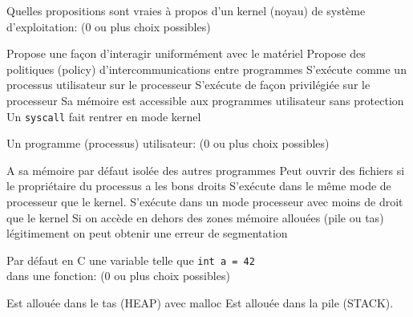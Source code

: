 \documentclass[11pt,a4paper,addpoint,answers]{exam}
\begin{document}
\begin{questions}
    \question[4] Quelles propositions sont vraies à propos d'un kernel (noyau) de système d'exploitation: (0 ou plus choix possibles)
    \begin{checkboxes}
        \CorrectChoice Propose une façon d'interagir uniformément avec le matériel
        \CorrectChoice Propose des politiques (policy) d'intercommunications entre programmes
        \choice S'exécute comme un processus utilisateur sur le processeur
        \CorrectChoice S'exécute de façon privilégiée sur le processeur
        \choice Sa mémoire est accessible aux programmes utilisateur sans protection
        \CorrectChoice Un \texttt{syscall} fait rentrer en mode kernel
    \end{checkboxes}

    \question[3] Un programme (processus) utilisateur: (0 ou plus choix possibles)
    \begin{checkboxes}
        \CorrectChoice A sa mémoire par défaut isolée des autres programmes
        \CorrectChoice Peut ouvrir des fichiers si le propriétaire du processus a les bons droits
        \choice S'exécute dans le même mode de processeur que le kernel.
        \CorrectChoice S'exécute dans un mode processeur avec moins de droit que le kernel
        \CorrectChoice Si on accède en dehors des zones mémoire allouées (pile ou tas) légitimement on peut obtenir une erreur
        de segmentation
    \end{checkboxes}

    \question[1] Par défaut en C une variable telle que \texttt{int a = 42}\\dans une fonction:
    (0 ou plus choix possibles)
    \begin{checkboxes}
        \choice Est allouée dans le tas (HEAP) avec malloc
        \CorrectChoice Est allouée dans la pile (STACK).
    \end{checkboxes}
  \end{questions}
\end{document}
